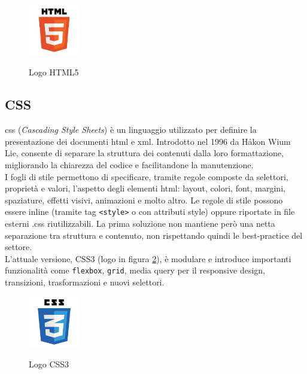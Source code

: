 \begin{figure}[H]
    \centering
    \includegraphics[width=0.2\textwidth, alt={Logo HTML5}]{img/html5.png}
    \caption[Logo HTML5]{Logo HTML5}\label{fig:logo_HTML5}
\end{figure}

\subsection{CSS}
\label{subsec:css}
\noindent \acrshort{css} (\textit{Cascading Style Sheets}) è un linguaggio utilizzato per definire la presentazione dei documenti \acrshort{html} e \acrshort{xml}. Introdotto nel 1996 da Håkon Wium Lie, consente di separare la struttura dei contenuti dalla loro formattazione, migliorando la chiarezza del codice e facilitandone la manutenzione.\\ 
I fogli di stile permettono di specificare, tramite regole composte da selettori, proprietà e valori, l’aspetto degli elementi \acrshort{html}: layout, colori, font, margini, spaziature, effetti visivi, animazioni e molto altro. Le regole di stile possono essere inline (tramite tag \texttt{<style>} o con attributi style) oppure riportate in file esterni .css riutilizzabili. La prima soluzione non mantiene però una netta separazione tra struttura e contenuto, non rispettando quindi le best-practice del settore.\\ 
L'attuale versione, CSS3 (logo in figura \ref{fig:logo_CSS3}), è modulare e introduce importanti funzionalità come \texttt{flexbox}, \texttt{grid}, media query per il responsive design, transizioni, trasformazioni e nuovi selettori.
\begin{figure}[H]
    \centering
    \includegraphics[width=0.2\textwidth, alt={Logo CSS3}]{img/css3.png}
    \caption[Logo CSS3]{Logo CSS3}\label{fig:logo_CSS3}
\end{figure}

